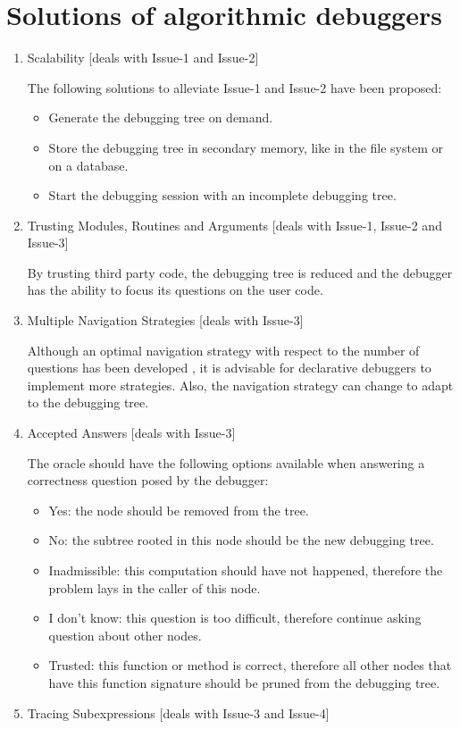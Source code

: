 \section{Solutions of algorithmic debuggers}
\begin{enumerate}
    \item Scalability [deals with Issue-1 and Issue-2]
    
The following solutions to alleviate Issue-1 and Issue-2 have been proposed:
\begin{itemize}
    \item Generate the debugging tree on demand.
    \item Store the debugging tree in secondary memory, like in the file system or on a database.
    \item Start the debugging session with an incomplete debugging tree.
\end{itemize}
    \item Trusting Modules, Routines and Arguments [deals with Issue-1, Issue-2 and Issue-3]
    
By trusting third party code, the debugging tree is reduced and the debugger has the ability to focus its questions on the user code.
    \item Multiple Navigation Strategies [deals with Issue-3]
    
Although an optimal navigation strategy with respect to the number of questions has been developed \cite{optimal_strategy}, it is advisable for declarative debuggers to implement more strategies.
Also, the navigation strategy can change to adapt to the debugging tree.

\item Accepted Answers [deals with Issue-3]

The oracle should have the following options available when answering a correctness question posed by the debugger:
\begin{itemize}
    \item Yes: the node should be removed from the tree.
    \item No: the subtree rooted in this node should be the new debugging tree.
    \item Inadmissible: this computation should have not happened, therefore the problem lays in the caller of this node.
    \item I don't know: this question is too difficult, therefore continue asking question about other nodes.
    \item Trusted: this function or method is correct, therefore all other nodes that have this function signature should be pruned from the debugging tree.
\end{itemize}
\item Tracing Subexpressions [deals with Issue-3 and Issue-4]


\end{enumerate}
